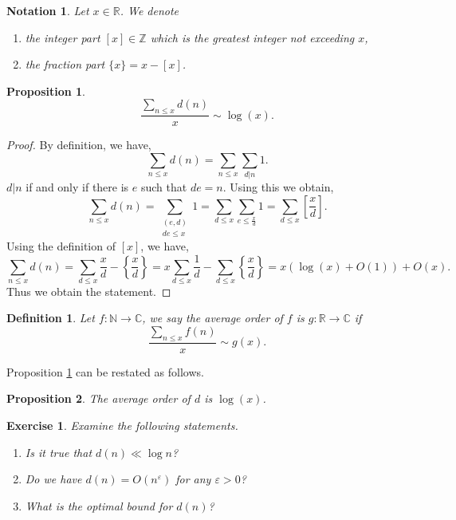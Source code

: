 \documentclass{article}
\newtheorem{proposition}{Proposition}[section]
\newtheorem{definition}{Definition}[section]
\newtheorem{notation}{Notation}[section]
\newtheorem{exercise}{Exercise}[section]
\newcommand{\N}[0]{\mathbb{N}}
\newcommand{\R}[0]{\mathbb{R}}
\newcommand{\Z}[0]{\mathbb{Z}}
\newcommand{\C}[0]{\mathbb{C}}
\begin{document}
\begin{notation}
  Let $x\in\R$. We denote 
  \begin{enumerate}
    \item the integer part $[x]\in \Z$ which is the greatest integer not exceeding $x$,
    \item the fraction part $\{x\} = x-[x]$.
  \end{enumerate}
\end{notation}

\begin{proposition}
  \label{average_order_d}
  \begin{equation*}
    {\frac {\sum_{n\leq x}d(n)} x} \sim \log(x).
  \end{equation*}
\end{proposition}
\begin{proof}
  By definition, we have,
  \begin{equation*}
    \sum_{n\leq x}d(n) = \sum_{n\leq x}\sum_{d|n}1.
  \end{equation*}
  $d|n $ if and only if there is $e$ such that $de=n$. Using this we obtain,
  \begin{equation*}
    \sum_{n\leq x}d(n) = \sum_{\substack{(e,d)\\de \leq x}}1 = \sum_{d\leq x}\sum_{e\leq {\frac x d}}1 = \sum_{d\leq x}\left[{\frac x d}\right].
  \end{equation*}
  Using the definition of $[x]$, we have,
  \begin{equation*}
    \sum_{n\leq x}d(n) = \sum_{d\leq x}{\frac x d} - \left\{{\frac x d}\right\} = x\sum_{d\leq x}{\frac 1 d}-\sum_{d\leq x}\left\{{\frac x d}\right\} = x(\log(x)+O(1))+O(x).
  \end{equation*}
  Thus we obtain the statement.
\end{proof}
\begin{definition}
  Let $f:\N\to\C$, we say the average order of $f$ is $g:\R\to \C$ if 
  \begin{equation*}
    {\frac{{\sum_{n\leq x}}{f(n)}} x}\sim g(x).
  \end{equation*}
\end{definition}

Proposition \ref{average_order_d} can be restated as follows.

\begin{proposition}
  The average order of $d$ is $\log(x)$.
\end{proposition}

\begin{exercise}
  Examine the following statements.
  \begin{enumerate}
    \item Is it true that $d(n)\ll \log n$?
    \item Do we have $d(n) = O(n^\varepsilon)$ for any $\varepsilon>0$?
    \item What is the optimal bound for $d(n)$? 
  \end{enumerate}
\end{exercise}
\end{document}
